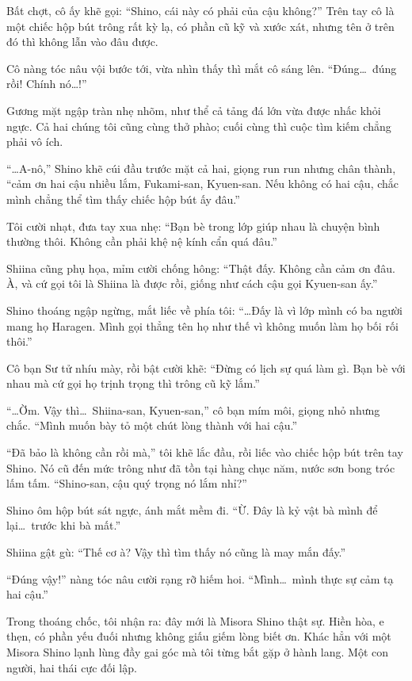 \documentclass[../main.tex]{subfiles}
\begin{document}
Bất chợt, cô ấy khẽ gọi: ``Shino, cái này có phải của cậu không?'' Trên tay cô là một chiếc hộp bút trông rất kỳ lạ, có phần cũ kỹ và xước xát, nhưng tên ở trên đó thì không lẫn vào đâu được.

Cô nàng tóc nâu vội bước tới, vừa nhìn thấy thì mắt cô sáng lên. ``Đúng\dots\ đúng rồi! Chính nó\dots!''

Gương mặt ngập tràn nhẹ nhõm, như thể cả tảng đá lớn vừa được nhấc khỏi ngực. Cả hai chúng tôi cũng cùng thở phào; cuối cùng thì cuộc tìm kiếm chẳng phải vô ích.

``\dots A-nô,'' Shino khẽ cúi đầu trước mặt cả hai, giọng run run nhưng chân thành, ``cảm ơn hai cậu nhiều lắm, Fukami-san, Kyuen-san. Nếu không có hai cậu, chắc mình chẳng thể tìm thấy chiếc hộp bút ấy đâu.''

Tôi cười nhạt, đưa tay xua nhẹ: ``Bạn bè trong lớp giúp nhau là chuyện bình thường thôi. Không cần phải khệ nệ kính cẩn quá đâu.''

Shiina cũng phụ họa, mỉm cười chống hông: ``Thật đấy. Không cần cảm ơn đâu. À, và cứ gọi tôi là Shiina là được rồi, giống như cách cậu gọi Kyuen-san ấy.''

Shino thoáng ngập ngừng, mắt liếc về phía tôi: ``\dots Đấy là vì lớp mình có ba người mang họ Haragen. Mình gọi thẳng tên họ như thế vì không muốn làm họ bối rối thôi.''

Cô bạn Sư tử nhíu mày, rồi bật cười khẽ: ``Đừng có lịch sự quá làm gì. Bạn bè với nhau mà cứ gọi họ trịnh trọng thì trông cũ kỹ lắm.''

``\dots Ờm. Vậy thì\dots\ Shiina-san, Kyuen-san,'' cô bạn mím môi, giọng nhỏ nhưng chắc. ``Mình muốn bày tỏ một chút lòng thành với hai cậu.''

``Đã bảo là không cần rồi mà,'' tôi khẽ lắc đầu, rồi liếc vào chiếc hộp bút trên tay Shino. Nó cũ đến mức trông như đã tồn tại hàng chục năm, nước sơn bong tróc lấm tấm. ``Shino-san, cậu quý trọng nó lắm nhỉ?''

Shino ôm hộp bút sát ngực, ánh mắt mềm đi. ``Ừ. Đây là kỷ vật bà mình để lại\dots\ trước khi bà mất.''

Shiina gật gù: ``Thế cơ à? Vậy thì tìm thấy nó cũng là may mắn đấy.''

``Đúng vậy!'' nàng tóc nâu cười rạng rỡ hiếm hoi. ``Mình\dots\ mình thực sự cảm tạ hai cậu.''

Trong thoáng chốc, tôi nhận ra: đây mới là Misora Shino thật sự. Hiền hòa, e thẹn, có phần yếu đuối nhưng không giấu giếm lòng biết ơn. Khác hẳn với một Misora Shino lạnh lùng đầy gai góc mà tôi từng bắt gặp ở hành lang. Một con người, hai thái cực đối lập.
\end{document}
